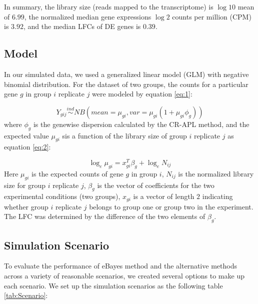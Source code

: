 In summary, the library size (reads mapped to the transcriptome) is $\log{10}$ mean of $6.99$, the normalized median gene expressions $\log{2}$ counts per million (CPM) is $3.92$, and the median LFCs of DE genes is $0.39$. 


\subsection{Model}

In our simulated data, we used a generalized linear model (GLM) with negative binomial distribution. For the dataset of two groups, the counts for a particular gene $g$ in group $i$ replicate $j$ were modeled by equation \ref{eq:1}:

\begin{equation}
\label{eq:1}
Y_{gij} \stackrel{ind}{\sim} NB(mean = \mu_{gi}, var = \mu_{gi}(1+\mu_{gi}\phi_{g}))
\end{equation}
where $\phi_g$ is the genewise dispersion calculated by the CR-APL method, and the expected value $\mu_{gi}$ sis a function of the library size of group $i$ replicate $j$ as equation \ref{eq:2}:

\begin{equation}
\label{eq:2}
\log_e \mu_{gi} = x_{gi}^T \beta_g + \log_e N_{ij}
\end{equation}
Here $\mu_{gi}$ is the expected counts of gene $g$ in group $i$, $N_{ij}$ is the normalized library size for group $i$ replicate $j$, $\beta_g$ is the vector of coefficients for the two experimental conditions (two groups), $x_{gi}$ is a vector of length $2$ indicating whether group $i$ replicate $j$ belongs to group one or group two in the experiment. The LFC was determined by the difference of the two elements of $\beta_g$. 



\subsection{Simulation Scenario}

To evaluate the performance of eBayes method and the alternative methods across a variety of reasonable scenarios, we created several options to make up each scenario. We set up the simulation scenarios as the following table \ref{tab:Scenario}:

